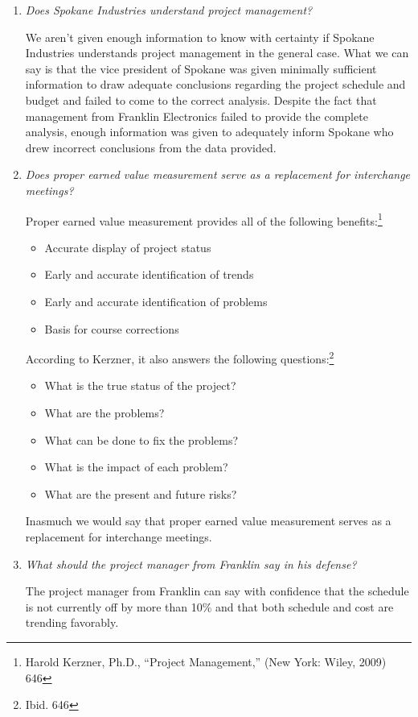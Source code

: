 \documentclass[letterpaper,10pt]{article}
\begin{document}
\begin{enumerate}
\item \emph{Does Spokane Industries understand project management?}
\par We aren't given enough information to know with certainty if Spokane Industries understands project management in the general case.  What we can say is that the vice president of Spokane was given minimally sufficient information to draw adequate conclusions regarding the project schedule and budget and failed to come to the correct analysis.  Despite the fact that management from Franklin Electronics failed to provide the complete analysis, enough information was given to adequately inform Spokane who drew incorrect conclusions from the data provided.

\item \emph{Does proper earned value measurement serve as a replacement for interchange meetings?}
\par Proper earned value measurement provides all of the following benefits:\footnote{Harold Kerzner, Ph.D., ``Project Management,'' (New York: Wiley, 2009) 646}
\begin{itemize}
	\item Accurate display of project status
	\item Early and accurate identification of trends
	\item Early and accurate identification of problems
	\item Basis for course corrections
\end{itemize}

According to Kerzner, it also answers the following questions:\footnote{Ibid. 646}
\begin{itemize}
	\item What is the true status of the project?
	\item What are the problems?
	\item What can be done to fix the problems?
	\item What is the impact of each problem?
	\item What are the present and future risks?
\end{itemize}

Inasmuch we would say that proper earned value measurement serves as a replacement for interchange meetings.

\item \emph{What should the project manager from Franklin say in his defense?}
\par The project manager from Franklin can say with confidence that the schedule is not currently off by more than 10\% and that both schedule and cost are trending favorably.
\end{enumerate}
\end{document}
